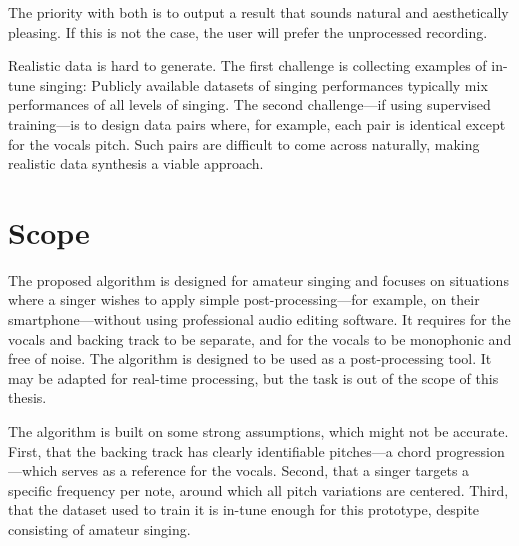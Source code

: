 The priority with both is to output a result that sounds natural and aesthetically pleasing. If this is not the case, the user will prefer the unprocessed recording. 

Realistic data is hard to generate. The first challenge is collecting examples of in-tune singing: Publicly available datasets of singing performances typically mix performances of all levels of singing. The second challenge---if using supervised training---is to design data pairs where, for example, each pair is identical except for the vocals pitch. Such pairs are difficult to come across naturally, making realistic data synthesis a viable approach.

\section{Scope}
The proposed algorithm is designed for amateur singing and focuses on situations where a singer wishes to apply simple post-processing---for example, on their smartphone---without using professional audio editing software. It requires for the vocals and backing track to be separate, and for the vocals to be monophonic and free of noise. The algorithm is designed to be used as a post-processing tool. It may be adapted for real-time processing, but the task is out of the scope of this thesis.

The algorithm is built on some strong assumptions, which might not be accurate. First, that the backing track has clearly identifiable pitches---a chord progression---which serves as a reference for the vocals. Second, that a singer targets a specific frequency per note, around which all pitch variations are centered. Third, that the dataset used to train it is in-tune enough for this prototype, despite consisting of amateur singing. %

